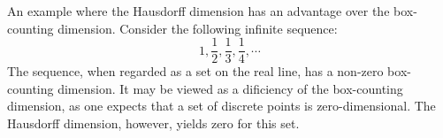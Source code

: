 %

%

An example where the Hausdorff dimension has an advantage over the box-counting dimension.
Consider the following infinite sequence:
\begin{equation*}
  1, \frac{1}{2}, \frac{1}{3}, \frac{1}{4}, \cdots
\end{equation*}
The sequence, when regarded as a set on the real line, has a non-zero box-counting dimension.
It may be viewed as a dificiency of the box-counting dimension, as one expects that
a set of discrete points is zero-dimensional.
The Hausdorff dimension, however, yields zero for this set.

